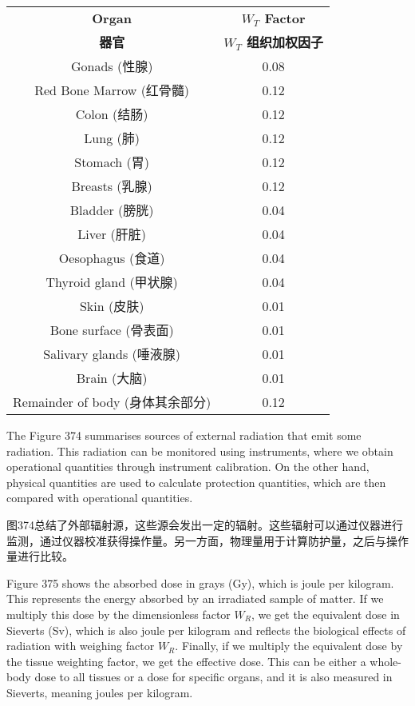 \documentclass[dvipsnames, svgnames,a4paper,11pt]{article}
\begin{document}
\begin{table}[h]
      \centering
      \label{table8}
      \begin{tabular}{cc}
      \toprule
      \textbf{Organ} & \textbf{$W_T$ Factor} \\
      \textbf{器官} & \textbf{$W_T$ 组织加权因子} \\
      \midrule
      Gonads (性腺) & 0.08 \\
      Red Bone Marrow (红骨髓) & 0.12 \\
      Colon (结肠) & 0.12 \\
      Lung (肺) & 0.12 \\
      Stomach (胃) & 0.12 \\
      Breasts (乳腺) & 0.12 \\
      Bladder (膀胱) & 0.04 \\
      Liver (肝脏) & 0.04 \\
      Oesophagus (食道) & 0.04 \\
      Thyroid gland (甲状腺) & 0.04 \\
      Skin (皮肤) & 0.01 \\
      Bone surface (骨表面) & 0.01 \\
      Salivary glands (唾液腺) & 0.01 \\
      Brain (大脑) & 0.01 \\
      Remainder of body (身体其余部分) & 0.12 \\
      \bottomrule
      \end{tabular}
      \end{table}





The Figure 374 summarises sources of external radiation that emit some radiation. This radiation can be monitored using instruments, where we obtain operational quantities through instrument calibration. On the other hand, physical quantities are used to calculate protection quantities, which are then compared with operational quantities.  

图374总结了外部辐射源，这些源会发出一定的辐射。这些辐射可以通过仪器进行监测，通过仪器校准获得操作量。另一方面，物理量用于计算防护量，之后与操作量进行比较。

Figure 375 shows the absorbed dose in grays (Gy), which is joule per kilogram. This represents the energy absorbed by an irradiated sample of matter. If we multiply this dose by the dimensionless factor \(W_R\), we get the equivalent dose in Sieverts (Sv), which is also joule per kilogram and reflects the biological effects of radiation with weighing factor \(W_R\). Finally, if we multiply the equivalent dose by the tissue weighting factor, we get the effective dose. This can be either a whole-body dose to all tissues or a dose for specific organs, and it is also measured in Sieverts, meaning joules per kilogram.
\end{document}
